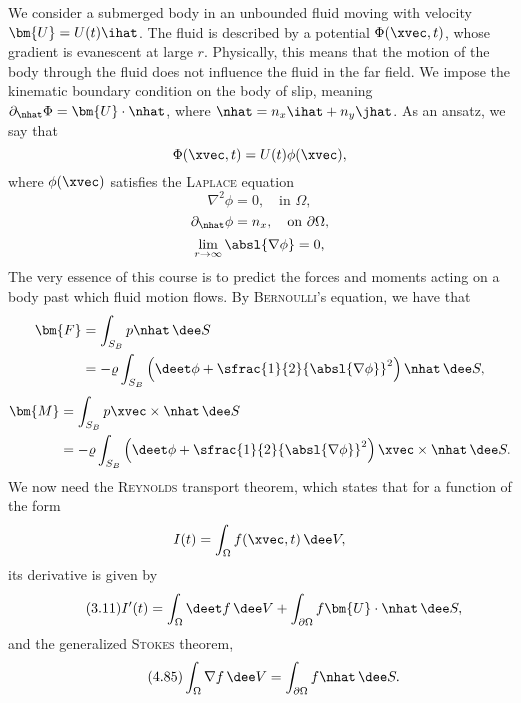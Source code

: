 \begin{figure}[H]
    \centering
    
\end{figure}
We consider a submerged body in an unbounded fluid moving with velocity $\bm{U} = U(t)\ihat$.
The fluid is described by a potential $\Phi(\xvec, t)$, whose gradient is evanescent at large $r$.
Physically, this means that the motion of the body through the fluid does not influence the fluid in the far field.
We impose the kinematic boundary condition on the body of slip, meaning $\partial_{\nhat} \Phi = \bm{U}\cdot\nhat$, where $\nhat = n_x \ihat + n_y \jhat$.
As an ansatz, we say that
\[
    \Phi(\xvec, t) = U(t) \phi(\xvec),
\]
where $\phi(\xvec)$ satisfies the \textsc{Laplace} equation
\[
    \nabla^2 \phi = 0, \quad \text{in } \Omega,
\]
\[
    \partial_{\nhat} \phi = n_x, \quad \text{on } \partial\Omega,
\]
\[
    \lim_{r \to \infty} \absl{\nabla\phi} = 0,
\]
The very essence of this course is to predict the forces and moments acting on a body past which fluid motion flows.
By \textsc{Bernoulli}'s equation, we have that
\begin{equation*}
    \begin{aligned}
        \bm{F} & = \int_{S_B} p \nhat\,\dee S\\
        & = -\varrho\int_{S_B} \left(\deet\phi + \sfrac{1}{2}{\absl{\nabla\phi}}^2\right)\nhat \,\dee S,
    \end{aligned}
\end{equation*}
\begin{equation*}
    \begin{aligned}
        \bm{M} & = \int_{S_B} p \xvec\times\nhat \,\dee S\\
        & = -\varrho \int_{S_B} \left( \deet\phi + \sfrac{1}{2}{\absl{\nabla\phi}}^2 \right) \xvec\times\nhat \,\dee S.
    \end{aligned}
\end{equation*}
We now need the \textsc{Reynolds} transport theorem, which states that for a function of the form
\[
    I(t) = \int_{\Omega} f(\xvec, t) \,\dee V,
\]
its derivative is given by
\begin{equation}\tag{3.11}\label{eq:REYNOLDS_transport}
    I^{\prime}(t) = \int_{\Omega} \deet f \,\dee V + \int_{\partial\Omega} f \bm{U}\cdot\nhat \,\dee S,
\end{equation}
and the generalized \textsc{Stokes} theorem,
\begin{equation}\tag{4.85}\label{eq:generalized_STOKES}
    \int_{\Omega} \nabla f \,\dee V = \int_{\partial\Omega} f \nhat \,\dee S.
\end{equation}
